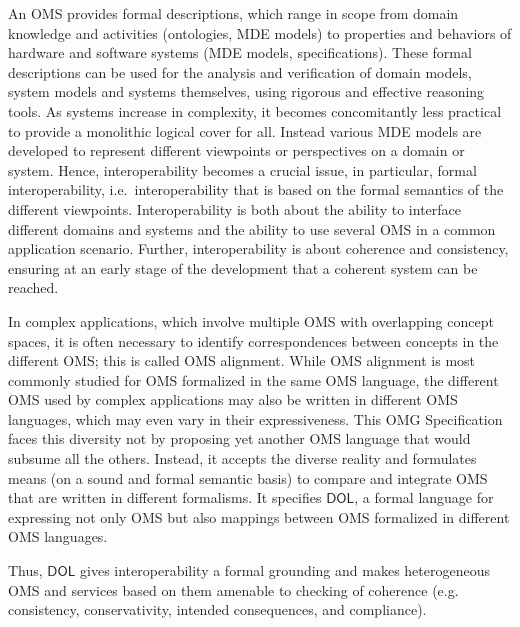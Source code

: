 \documentclass[10pt,fleqn,final]{scrreprt}
\makeatletter
\newcommand*{\eg}{e.g.\@\xspace}
\newcommand*{\IS}{OMG Specification\xspace}
\newcommand*{\DOL}{\ensuremath{\mathsf{DOL}}\xspace}
\makeatother
\begin{document}
An OMS provides formal descriptions, which range in scope from domain knowledge and activities
(ontologies, MDE models) to properties and behaviors of hardware and software systems (MDE models,
specifications). These formal descriptions can be used for the analysis and verification of domain
models, system models and systems themselves, using rigorous and effective reasoning tools.   As 
systems increase in complexity, it becomes concomitantly less practical to provide a monolithic 
logical cover for all.  Instead various MDE models are developed to represent different viewpoints or 
perspectives on a domain or system. 
 Hence, interoperability becomes
a crucial issue, in particular, formal interoperability, i.e.\ interoperability that is based on
the formal semantics of the different viewpoints. Interoperability is both about the ability to 
interface different domains and systems and the ability to use several OMS in a common application
scenario. Further,  interoperability is about coherence and consistency, ensuring at an early stage of the development
that a coherent system can be reached.


In complex applications, which involve multiple OMS with overlapping concept spaces,
it is often necessary to identify correspondences between concepts in the different OMS; this is called  OMS alignment. 
While OMS alignment is most commonly studied for OMS formalized in the same OMS 
language, the different OMS used by complex applications may also be written in different 
OMS languages, which may even vary in their expressiveness. 
This \IS faces this diversity not by proposing yet another OMS language that would subsume all the others.  
Instead, it accepts the diverse reality and formulates means (on a sound and formal semantic basis) 
to compare and integrate OMS that are written in different formalisms.
It specifies \DOL, a formal language for
expressing not only OMS but also mappings between OMS formalized in different OMS languages.

Thus, \DOL gives interoperability a formal grounding and makes heterogeneous OMS and services based
on them amenable to checking of coherence (\eg consistency, conservativity, intended consequences,
and compliance).
\end{document}
